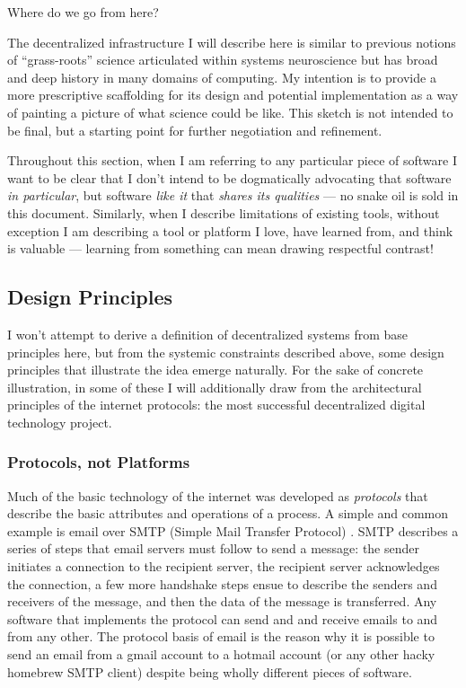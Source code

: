 \documentclass[11pt]{article}
\begin{document}
\begin{multicols}{2}
 Where do we go from here?

The decentralized infrastructure I will describe here is similar to
previous notions of ``grass-roots'' science articulated within systems
neuroscience \cite{mainenBetterWayCrack2016}  but has broad and
deep history in many domains of computing. My intention is to provide a
more prescriptive scaffolding for its design and potential
implementation as a way of painting a picture of what science could be
like. This sketch is not intended to be final, but a starting point for
further negotiation and refinement.

Throughout this section, when I am referring to any particular piece of
software I want to be clear that I don't intend to be dogmatically
advocating that software \emph{in particular}, but software \emph{like
it} that \emph{shares its qualities} --- no snake oil is sold in this
document. Similarly, when I describe limitations of existing tools,
without exception I am describing a tool or platform I love, have
learned from, and think is valuable --- learning from something can mean
drawing respectful contrast!

\hypertarget{design-principles}{%
\subsection{Design Principles}\label{design-principles}}

I won't attempt to derive a definition of decentralized systems from
base principles here, but from the systemic constraints described above,
some design principles that illustrate the idea emerge naturally. For
the sake of concrete illustration, in some of these I will additionally
draw from the architectural principles of the internet protocols: the
most successful decentralized digital technology project.

\hypertarget{protocols-not-platforms}{%
\subsubsection{Protocols, not Platforms}\label{protocols-not-platforms}}

Much of the basic technology of the internet was developed as
\emph{protocols} that describe the basic attributes and operations of a
process. A simple and common example is email over SMTP (Simple Mail
Transfer Protocol)\cite{Rfc5321SimpleMail} . SMTP describes a
series of steps that email servers must follow to send a message: the
sender initiates a connection to the recipient server, the recipient
server acknowledges the connection, a few more handshake steps ensue to
describe the senders and receivers of the message, and then the data of
the message is transferred. Any software that implements the protocol
can send and and receive emails to and from any other. The protocol
basis of email is the reason why it is possible to send an email from a
gmail account to a hotmail account (or any other hacky homebrew SMTP
client) despite being wholly different pieces of software.


\end{multicols}
\end{document}
